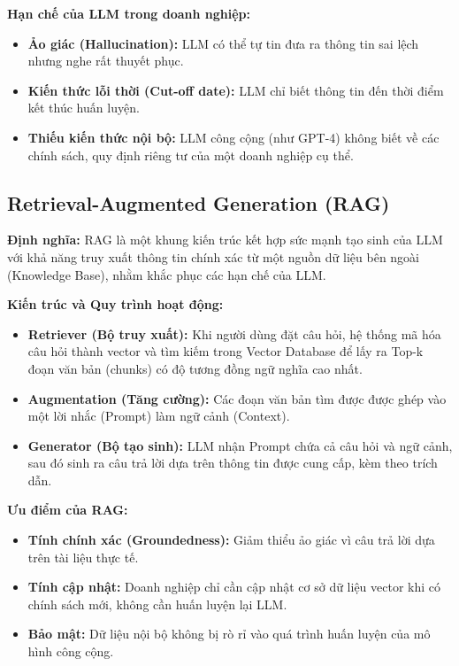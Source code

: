 \documentclass[12pt,a4paper]{report}
\begin{document}
\textbf{Hạn chế của LLM trong doanh nghiệp:}
\begin{itemize}
    \item \textbf{Ảo giác (Hallucination):} LLM có thể tự tin đưa ra thông tin sai lệch nhưng nghe rất thuyết phục.
    \item \textbf{Kiến thức lỗi thời (Cut-off date):} LLM chỉ biết thông tin đến thời điểm kết thúc huấn luyện.
    \item \textbf{Thiếu kiến thức nội bộ:} LLM công cộng (như GPT-4) không biết về các chính sách, quy định riêng tư của một doanh nghiệp cụ thể.
\end{itemize}

\subsection{Retrieval-Augmented Generation (RAG)}
\textbf{Định nghĩa:} RAG là một khung kiến trúc kết hợp sức mạnh tạo sinh của LLM với khả năng truy xuất thông tin chính xác từ một nguồn dữ liệu bên ngoài (Knowledge Base), nhằm khắc phục các hạn chế của LLM.

\textbf{Kiến trúc và Quy trình hoạt động:}
\begin{itemize}
    \item \textbf{Retriever (Bộ truy xuất):} Khi người dùng đặt câu hỏi, hệ thống mã hóa câu hỏi thành vector và tìm kiếm trong Vector Database để lấy ra Top-k đoạn văn bản (chunks) có độ tương đồng ngữ nghĩa cao nhất.
    \item \textbf{Augmentation (Tăng cường):} Các đoạn văn bản tìm được được ghép vào một lời nhắc (Prompt) làm ngữ cảnh (Context).
    \item \textbf{Generator (Bộ tạo sinh):} LLM nhận Prompt chứa cả câu hỏi và ngữ cảnh, sau đó sinh ra câu trả lời dựa trên thông tin được cung cấp, kèm theo trích dẫn.
\end{itemize}

\textbf{Ưu điểm của RAG:}
\begin{itemize}
    \item \textbf{Tính chính xác (Groundedness):} Giảm thiểu ảo giác vì câu trả lời dựa trên tài liệu thực tế.
    \item \textbf{Tính cập nhật:} Doanh nghiệp chỉ cần cập nhật cơ sở dữ liệu vector khi có chính sách mới, không cần huấn luyện lại LLM.
    \item \textbf{Bảo mật:} Dữ liệu nội bộ không bị rò rỉ vào quá trình huấn luyện của mô hình công cộng.
\end{itemize}
\end{document}
